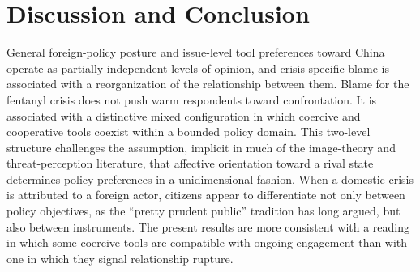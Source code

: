 \documentclass[12pt,letterpaper]{article}
\begin{document}
\section{Discussion and Conclusion}
\label{sec:discussion}

General foreign-policy posture and issue-level tool preferences toward China operate as partially independent levels of opinion, and crisis-specific blame is associated with a reorganization of the relationship between them. Blame for the fentanyl crisis does not push warm respondents toward confrontation. It is associated with a distinctive mixed configuration in which coercive and cooperative tools coexist within a bounded policy domain. This two-level structure challenges the assumption, implicit in much of the image-theory and threat-perception literature, that affective orientation toward a rival state determines policy preferences in a unidimensional fashion. When a domestic crisis is attributed to a foreign actor, citizens appear to differentiate not only between policy objectives, as the ``pretty prudent public'' tradition has long argued, but also between instruments. The present results are more consistent with a reading in which some coercive tools are compatible with ongoing engagement than with one in which they signal relationship rupture.
\end{document}
